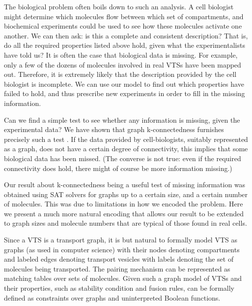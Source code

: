 The biological problem often boils down to such an analysis. A cell biologist might determine which molecules flow between which set of compartments, and biochemical experiments could be used to see how these molecules activate one another. We can then ask: is this a complete and consistent description? That is, do all the required properties listed above hold, given what the experimentalists have told us? It is often the case that biological data is missing. For example, only a few of the dozens of molecules involved in real VTSs have been mapped out. Therefore, it is extremely likely that the description provided by the cell biologist is incomplete. We can use our model to find out which properties have failed to hold, and thus prescribe new experiments in order to fill in the missing information.

Can we find a simple test to see whether any information is missing, given the experimental data? We have shown that graph k-connectedness furnishes precisely such a test \cite{shukla}. If the data provided by cell-biologists, suitably represented as a graph, does not have a certain degree of connectivity, this implies that some biological data has been missed. (The converse is not true: even if the required connectivity does hold, there might of course be more information missing.)

Our result about k-connectedness being a useful test of missing information \cite{shukla} was obtained using SAT solvers for graphs up to a certain size, and a certain number of molecules. This was due to limitations in how we encoded the problem. Here we present a much more natural encoding that allows our result to be extended to graph sizes and molecule numbers that are typical of those found in real cells.


\label{subsec:graphmodel}
%
Since a VTS is a transport graph, it is but natural to formally model
VTS as graphs (as used in computer science) with their nodes denoting
compartments and labeled edges denoting transport vesicles with labels
denoting the set of molecules being transported. The pairing mechanism
can be represented as matching tables over sets of molecules.
%
Given such a graph model of VTSs and their properties, such as
stability condition and fusion rules, can be formally defined as
constraints over graphs and uninterpreted Boolean functions.
%
\

